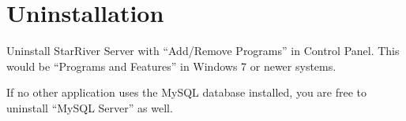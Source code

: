\section{Uninstallation}\label{uninstallation}

Uninstall StarRiver Server with ``Add/Remove Programs'' in Control
Panel. This would be ``Programs and Features'' in Windows 7 or newer
systems.

If no other application uses the MySQL database installed, you are free
to uninstall ``MySQL Server'' as well.
